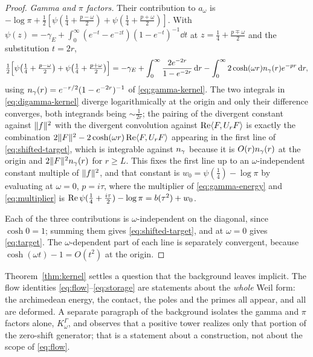 \begin{proof}
\emph{Gamma and $\pi$ factors.} Their contribution to $a_\omega$ is
$-\log\pi+\frac12[\psi(\frac14+\frac{p-\omega}2)+\psi(\frac14+\frac{p+\omega}2)]$.
With $\psi(z)=-\gamma_E+\int_0^\infty(e^{-t}-e^{-zt})(1-e^{-t})^{-1}\dd t$
\cite[\S5.9]{DLMF} at $z=\frac14+\frac{p\mp\omega}2$ and the substitution
$t=2r$,
\begin{equation}\label{eq:digamma-kernel}
 \tfrac12\Big[\psi\big(\tfrac14+\tfrac{p-\omega}2\big)
  +\psi\big(\tfrac14+\tfrac{p+\omega}2\big)\Big]
 =-\gamma_E+\int_0^\infty\frac{2e^{-2r}}{1-e^{-2r}}\,\mathrm d r
  -\int_0^\infty 2\cosh(\omega r)n_{\gamma}(r)e^{-pr}\,\mathrm d r ,
\end{equation}
using $n_{\gamma}(r)=e^{-r/2}(1-e^{-2r})^{-1}$ of \eqref{eq:gamma-kernel}. The two
integrals in \eqref{eq:digamma-kernel} diverge logarithmically at the origin and
only their difference converges, both integrands being $\sim\frac1{2r}$; the
pairing of the divergent constant against $\lVert f\rVert^2$ with the divergent
convolution against $\operatorname{Re}\langle F,U_rF\rangle$ is exactly the combination
$2\lVert F\rVert^2-2\cosh(\omega r)\operatorname{Re}\langle F,U_rF\rangle$ appearing in the first line of
\eqref{eq:shifted-target}, which is integrable against $n_{\gamma}$ because it is
$O(r)n_{\gamma}(r)$ at the origin and $2\lVert F\rVert^2n_{\gamma}(r)$ for $r\geq L$. This
fixes the first line up to an $\omega$-independent constant multiple of
$\lVert f\rVert^2$, and that constant is $w_0=\psi(\frac14)-\log\pi$ by evaluating at
$\omega=0$, $p=i\tau$, where the multiplier of \eqref{eq:gamma-energy} and
\eqref{eq:multiplier} is $\operatorname{Re}\psi(\frac14+\frac{i\tau}2)-\log\pi=b(\tau^2)+w_0$.

Each of the three contributions is $\omega$-independent on the diagonal, since
$\cosh0=1$; summing them gives \eqref{eq:shifted-target}, and at $\omega=0$
gives \eqref{eq:target}. The $\omega$-dependent part of each line is separately
convergent, because $\cosh(\omega t)-1=O(t^2)$ at the origin.
\end{proof}

\begin{remark}\label{rem:general}
Theorem~\ref{thm:kernel} settles a question that the background leaves implicit.
The flow identities \eqref{eq:flow}--\eqref{eq:storage} are statements about the
\emph{whole} Weil form: the archimedean energy, the contact, the poles and the
primes all appear, and all are deformed. A separate paragraph of the background
isolates the gamma and $\pi$ factors alone, $K_\omega^\Gamma$, and observes that
a positive tower realizes only that portion of the zero-shift generator; that is
a statement about a construction, not about the scope of \eqref{eq:flow}.
\end{remark}


